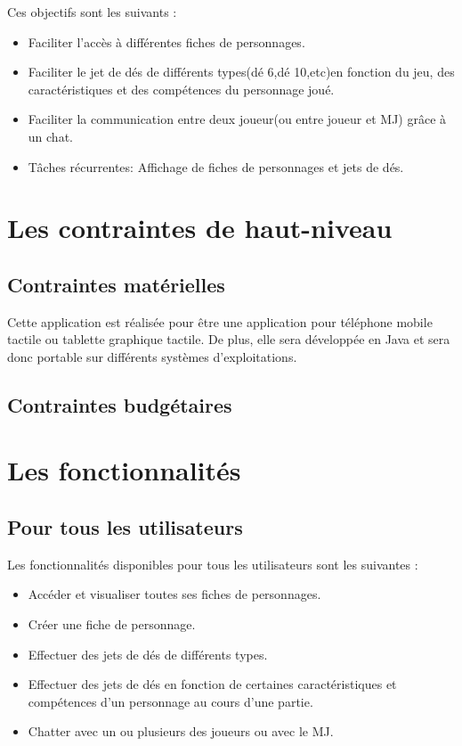 \documentclass[11pt,a4paper]{article}
\begin{document}
Ces objectifs sont les suivants :

\begin{itemize}
  \item Faciliter l'accès à différentes fiches de personnages.
  \item Faciliter le jet de dés de différents types(dé 6,dé 10,etc)en fonction
  du jeu, des caractéristiques et des compétences du personnage joué.
  \item Faciliter la communication entre deux joueur(ou entre joueur et MJ)
  grâce à un chat.
  \item Tâches récurrentes: Affichage de fiches de personnages et jets de dés.
\end{itemize}

\clearpage

\section{Les contraintes de haut-niveau}
\subsection{Contraintes matérielles}

Cette application est réalisée pour être une application pour téléphone mobile
tactile ou tablette graphique tactile. De plus, elle sera développée en Java et
sera donc portable sur différents systèmes d'exploitations.

\subsection{Contraintes budgétaires}


\section{Les fonctionnalités}

\subsection{Pour tous les utilisateurs}
Les fonctionnalités disponibles pour tous les utilisateurs sont les suivantes :

\begin{itemize}
  \item Accéder et visualiser toutes ses fiches de personnages.
  \item Créer une fiche de personnage.
  \item Effectuer des jets de dés de différents types.
  \item Effectuer des jets de dés en fonction de certaines caractéristiques et
  compétences d'un personnage au cours d'une partie.
  \item Chatter avec un ou plusieurs des joueurs ou avec le MJ.
\end{itemize}
\end{document}

